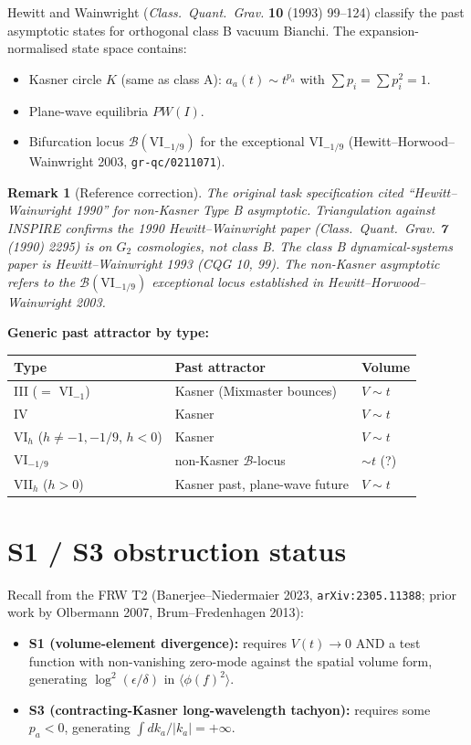 \documentclass[11pt,a4paper]{article}
\newtheorem{remark}{Remark}
\begin{document}
Hewitt and Wainwright (\textit{Class.\ Quant.\ Grav.} \textbf{10} (1993)
99--124) classify the past asymptotic states for orthogonal class B vacuum
Bianchi. The expansion-normalised state space contains:
\begin{itemize}
\item Kasner circle $K$ (same as class A): $a_a(t) \sim t^{p_a}$ with
$\sum p_i = \sum p_i^2 = 1$.
\item Plane-wave equilibria $PW(I)$.
\item Bifurcation locus $\mathcal{B}(\mathrm{VI}_{-1/9})$ for the
exceptional VI$_{-1/9}$ (Hewitt--Horwood--Wainwright 2003,
\texttt{gr-qc/0211071}).
\end{itemize}

\begin{remark}[Reference correction]
The original task specification cited ``Hewitt--Wainwright 1990'' for
non-Kasner Type B asymptotic. Triangulation against INSPIRE confirms the
1990 Hewitt--Wainwright paper (\textit{Class.\ Quant.\ Grav.} \textbf{7}
(1990) 2295) is on \emph{$G_2$ cosmologies}, not class B. The class B
dynamical-systems paper is Hewitt--Wainwright 1993 (CQG 10, 99). The
non-Kasner asymptotic refers to the $\mathcal{B}(\mathrm{VI}_{-1/9})$
exceptional locus established in Hewitt--Horwood--Wainwright 2003.
\end{remark}

\noindent\textbf{Generic past attractor by type:}
\begin{center}
\begin{tabular}{lll}
\hline
Type & Past attractor & Volume \\
\hline
III ($=$ VI$_{-1}$) & Kasner (Mixmaster bounces) & $V \sim t$ \\
IV & Kasner & $V \sim t$ \\
VI$_h$ ($h \neq -1, -1/9$, $h < 0$) & Kasner & $V \sim t$ \\
VI$_{-1/9}$ & non-Kasner $\mathcal{B}$-locus & $\sim t$ (?) \\
VII$_h$ ($h > 0$) & Kasner past, plane-wave future & $V \sim t$ \\
\hline
\end{tabular}
\end{center}

\section{S1 / S3 obstruction status}

Recall from the FRW T2 (Banerjee--Niedermaier 2023, \texttt{arXiv:2305.11388};
prior work by Olbermann 2007, Brum--Fredenhagen 2013):
\begin{itemize}
\item \textbf{S1 (volume-element divergence):} requires
  $V(t) \to 0$ AND a test function with non-vanishing zero-mode against
  the spatial volume form, generating $\log^2(\epsilon/\delta)$ in
  $\langle \phi(f)^2 \rangle$.
\item \textbf{S3 (contracting-Kasner long-wavelength tachyon):} requires
  some $p_a < 0$, generating $\int dk_a / |k_a| = +\infty$.
\end{itemize}
\end{document}
